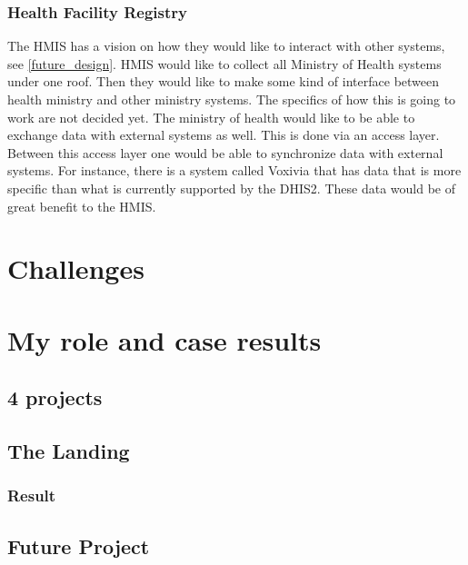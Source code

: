 \subsubsection{Health Facility Registry}
The HMIS has a vision on how they would like to interact with other systems, see \ref{future_design}. HMIS would like to collect all Ministry of Health systems under one roof. Then they would like to make some kind of interface between health ministry and other ministry systems. The specifics of how this is going to work are not decided yet. The ministry of health would like to be able to exchange data with external systems as well. This is done via an access layer. Between this access layer one would be able to synchronize data with external systems. For instance, there is a system called Voxivia that has data that is more specific than what is currently supported by the DHIS2. These data would be of great benefit to the HMIS. 




\section{Challenges}



\section{My role and case results}
\subsection{4 projects}
\subsection{The Landing}
\subsubsection{Result}
\subsection{Future Project}